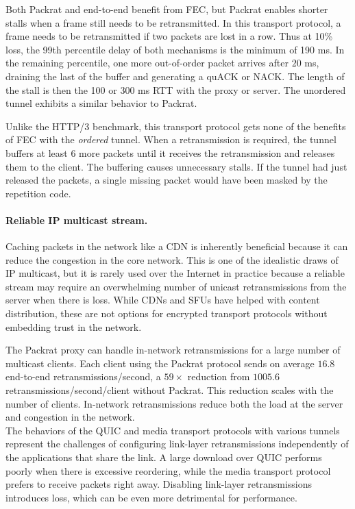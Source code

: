 Both Packrat and end-to-end benefit from FEC, but Packrat enables shorter stalls when
a frame still needs to be retransmitted. In this transport protocol, a frame
needs to be retransmitted if two packets are lost in a row. Thus at 10\% loss,
the 99th percentile delay of both mechanisms is the minimum of 190 ms. In the
remaining percentile, one more out-of-order packet arrives after $20$ ms,
draining the last of the buffer and generating a quACK or NACK. The length of
the stall is then the 100 or 300 ms RTT with the proxy or server. The unordered
tunnel exhibits a similar behavior to Packrat.

Unlike the HTTP/3 benchmark, this transport protocol gets none of the benefits
of FEC with the \textit{ordered} tunnel. When a retransmission is required, the
tunnel buffers at least 6 more packets until it receives the retransmission and
releases them to the client. The buffering causes unnecessary stalls. If the
tunnel had just released the packets, a single missing packet would have been
masked by the repetition code.

\paragraph{Reliable IP multicast stream.}

Caching packets in the network like a CDN is inherently beneficial because it
can reduce the congestion in the core network. This is one of the idealistic
draws of IP multicast, but it is rarely used over the Internet in practice
because a reliable stream may require an overwhelming number of unicast
retransmissions from the server when there is loss. While CDNs and SFUs have
helped with content distribution, these are not options for encrypted transport
protocols without embedding trust in the network.

The Packrat proxy can handle in-network retransmissions for a large number of
multicast clients. Each client using the Packrat protocol sends on average $16.8$
end-to-end retransmissions/second, a $59\!\times$ reduction from $1005.6$
retransmissions/second/client without Packrat. This reduction scales with the
number of clients. In-network retransmissions reduce both the load at the
server and congestion in the network.\\

\noindent
The behaviors of the QUIC and media transport protocols with various tunnels
represent the challenges of configuring link-layer retransmissions
independently of the applications that share the link. A large download
over QUIC performs poorly
when there is excessive reordering, while the media transport protocol prefers
to receive packets right away.
Disabling link-layer retransmissions introduces loss, which can be even more
detrimental for performance.

